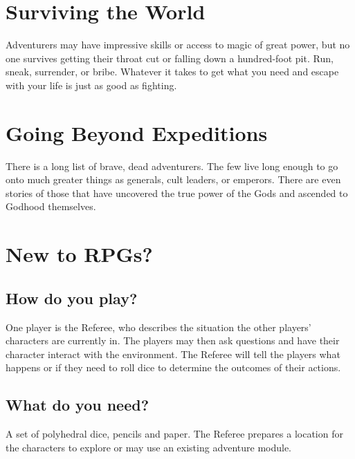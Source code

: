 \documentclass[itdr]{subfiles}
\begin{document}
\vfill
\break

\section*{Surviving the World}

Adventurers may have impressive skills or access to magic of great power, but no one survives getting their throat cut or falling down a hundred-foot pit. Run, sneak, surrender, or bribe. Whatever it takes to get what you need and escape with your life is just as good as fighting.

\section*{Going Beyond Expeditions}
There is a long list of brave, dead adventurers. The few live long enough to go onto much greater things as generals, cult leaders, or emperors. There are even stories of those that have uncovered the true power of the Gods and ascended to Godhood themselves.


\section*{New to RPGs?}

\subsection*{How do you play?}
One player is the Referee, who describes the situation the other players' characters are currently in. The players may then ask questions and have their character interact with the environment. The Referee will tell the players what happens or if they need to roll dice to determine the outcomes of their actions.

\subsection*{What do you need?}
A set of polyhedral dice, pencils and paper. The Referee prepares a location for the characters to explore or may use an existing adventure module.
\end{document}
